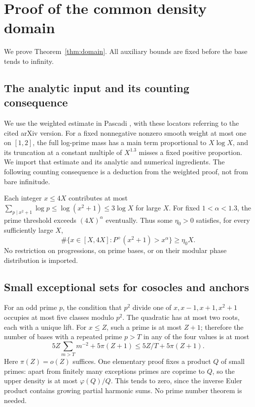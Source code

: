\documentclass[11pt,a4paper]{article}
\theoremstyle{definition}\newtheorem{question}[theorem]{Question}
\theoremstyle{remark}\newtheorem{remark}[theorem]{Remark}
\begin{document}
\appendix
\section{Proof of the common density domain}\label{app:domain}
We prove Theorem~\ref{thm:domain}. All auxiliary bounds are fixed
before the base tends to infinity.

\subsection{The analytic input and its counting consequence}
We use the weighted estimate in Pascadi \cite[Sections 6.1 and 6.3,
Notations 20 and 23, (6.20) and the concluding strict margin]{Pascadi},
with these locators referring to the cited arXiv version.
For a fixed nonnegative nonzero smooth weight at most one on $[1,2]$,
the full log-prime mass has a main term proportional to $X\log X$,
and its truncation at a constant multiple of $X^{1.3}$ misses a fixed
positive proportion. We import that estimate and its analytic and
numerical ingredients. The following counting consequence is a
deduction from the weighted proof, not from bare infinitude.

Each integer $x\le4X$ contributes at most
$\sum_{p\mid x^2+1}\log p\le\log(x^2+1)\le3\log X$ for large $X$.
For fixed $1<\alpha<1.3$, the prime threshold exceeds $(4X)^\alpha$
eventually. Thus some $\eta_0>0$ satisfies, for every sufficiently
large $X$,
\begin{equation}\label{eq:density-input}
 \#\{x\in[X,4X]:P^+(x^2+1)>x^\alpha\}\ge\eta_0 X.
\end{equation}
No restriction on progressions, on prime bases, or on their modular
phase distribution is imported.

\subsection{Small exceptional sets for cosocles and anchors}
For an odd prime $p$, the condition that $p^2$ divide one of
$x,x-1,x+1,x^2+1$ occupies at most five classes modulo $p^2$.
The quadratic has at most two roots, each with a unique lift.
For $x\le Z$, such a prime is at most $Z+1$; therefore the number
of bases with a repeated prime $p>T$ in any of the four values is at most
\begin{equation}\label{eq:square-tail}
 5Z\sum_{m>T}m^{-2}+5\pi(Z+1)\le5Z/T+5\pi(Z+1).
\end{equation}
Here $\pi(Z)=o(Z)$ suffices. One elementary proof fixes a product $Q$
of small primes: apart from finitely many exceptions primes are coprime
to $Q$, so the upper density is at most $\varphi(Q)/Q$.
This tends to zero, since the inverse Euler product contains growing
partial harmonic sums. No prime number theorem is needed.
\end{document}
